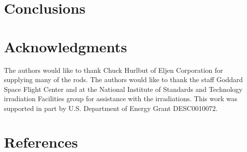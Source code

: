\documentclass[review]{elsarticle}
\begin{document}
\section{Conclusions}

\section{Acknowledgments}
The authors would like to thank Chuck Hurlbut of Eljen Corporation for supplying many of the rods.
The authors would like to thank the staff
Goddard Space Flight Center and at the National Institute of Standards and Technology irradiation
Facilities group for assistance
with the irradiations. 
This work was supported in part by U.S. Department of Energy Grant DESC0010072.

\section*{References}


\end{document}
